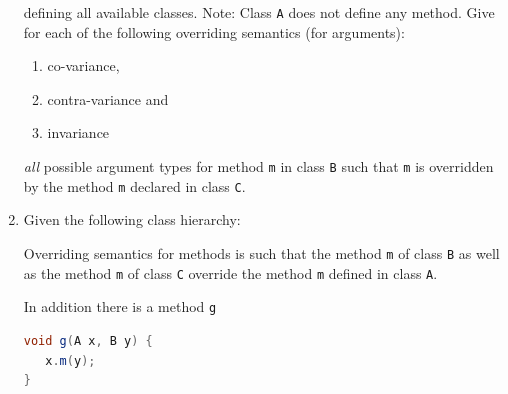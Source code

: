 \documentclass{article}
\begin{document}
\begin{enumerate}
\begin{center}
\end{center}
defining all available classes. Note: Class \lstinline!A! does not
define any method.
Give for each of the following overriding semantics (for arguments):
\begin{enumerate}
  \item co-variance,
  \item contra-variance and
  \item invariance
\end{enumerate}
\emph{all} possible argument types for method \lstinline!m! in class
\lstinline!B! such that \lstinline!m! is overridden by the method
\lstinline!m! declared in class \lstinline!C!.  \newpage
\item Given the following class hierarchy:\\

Overriding semantics for methods is such that the method \lstinline!m!
of class \lstinline!B! as well as the method \lstinline!m! of class
\lstinline!C! override the method \lstinline!m! defined in class
\lstinline!A!. 

In addition there is a method \lstinline!g! 
\begin{lstlisting}[language=Java, columns=flexible]
void g(A x, B y) {
   x.m(y);
}
\end{lstlisting}


\end{enumerate}
\end{document}
